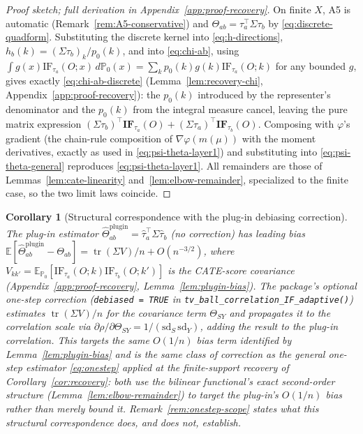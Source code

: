 \documentclass[11pt]{article}
\theoremstyle{plain}
\newtheorem{corollary}[theorem]{Corollary}
\theoremstyle{definition}
\theoremstyle{remark}
\newcommand{\E}{\mathbb{E}}
\newcommand{\PP}{\mathbb{P}}
\newcommand{\IF}{\mathrm{IF}}
\DeclareMathOperator{\tr}{tr}
\begin{document}
\begin{proof}[Proof sketch; full derivation in Appendix~\ref{app:proof-recovery}]
On finite $X$, A5 is automatic (Remark~\ref{rem:A5-conservative}) and
$\Theta_{ab}=\tau_a^\top\Sigma\tau_b$ by \eqref{eq:discrete-quadform}. Substituting the
discrete kernel into \eqref{eq:h-directions}, $h_b(k)=(\Sigma\tau_b)_k/p_0(k)$, and
into \eqref{eq:chi-ab}, using $\int g(x)\IF_{\tau_a}(O;x)\,d\PP_0(x)=\sum_kp_0(k)g(k)\IF_{\tau_a}(O;k)$
for any bounded $g$, gives exactly \eqref{eq:chi-ab-discrete}
(Lemma~\ref{lem:recovery-chi}, Appendix~\ref{app:proof-recovery}): the $p_0(k)$
introduced by the representer's denominator and the $p_0(k)$ from the integral
measure cancel, leaving the pure matrix expression $(\Sigma\tau_b)^\top\mathbf{IF}_{\tau_a}(O)+(\Sigma\tau_a)^\top\mathbf{IF}_{\tau_b}(O)$.
Composing with $\varphi$'s gradient (the chain-rule composition of $\nabla\varphi(m(\mu))$
with the moment derivatives, exactly as used in \eqref{eq:psi-theta-layer1}) and substituting into \eqref{eq:psi-theta-general}
reproduces \eqref{eq:psi-theta-layer1}. All remainders are those of
Lemmas~\ref{lem:cate-linearity} and~\ref{lem:elbow-remainder}, specialized to the
finite case, so the two limit laws coincide.
\end{proof}

\begin{corollary}[Structural correspondence with the plug-in debiasing correction]\label{cor:onestep-match}
The plug-in estimator $\hat\Theta_{ab}^{\mathrm{plugin}}=\hat\tau_a^\top\Sigma\hat\tau_b$
(no correction) has leading bias
$\E[\hat\Theta_{ab}^{\mathrm{plugin}}-\Theta_{ab}]=\tr(\Sigma V)/n+O(n^{-3/2})$, where
$V_{kk'}=\E_{\PP_0}[\IF_{\tau_a}(O;k)\IF_{\tau_b}(O;k')]$ is the CATE-score
covariance (Appendix~\ref{app:proof-recovery}, Lemma~\ref{lem:plugin-bias}). The
package's optional one-step correction (\texttt{debiased = TRUE} in
\texttt{tv\_ball\_correlation\_IF\_adaptive()}) estimates $\tr(\Sigma V)/n$ for the
covariance term $\Theta_{SY}$ and propagates it to the correlation scale via
$\partial\rho/\partial\Theta_{SY}=1/(\mathrm{sd}_S\,\mathrm{sd}_Y)$, adding the result
to the plug-in correlation. This targets the same $O(1/n)$ bias term identified by
Lemma~\ref{lem:plugin-bias} and is the same class of correction as the general
one-step estimator \eqref{eq:onestep} applied at the finite-support recovery of
Corollary~\ref{cor:recovery}: both use the bilinear functional's exact second-order
structure (Lemma~\ref{lem:elbow-remainder}) to target the plug-in's $O(1/n)$ bias
rather than merely bound it. Remark~\ref{rem:onestep-scope} states what this
structural correspondence does, and does not, establish.
\end{corollary}
\end{document}

